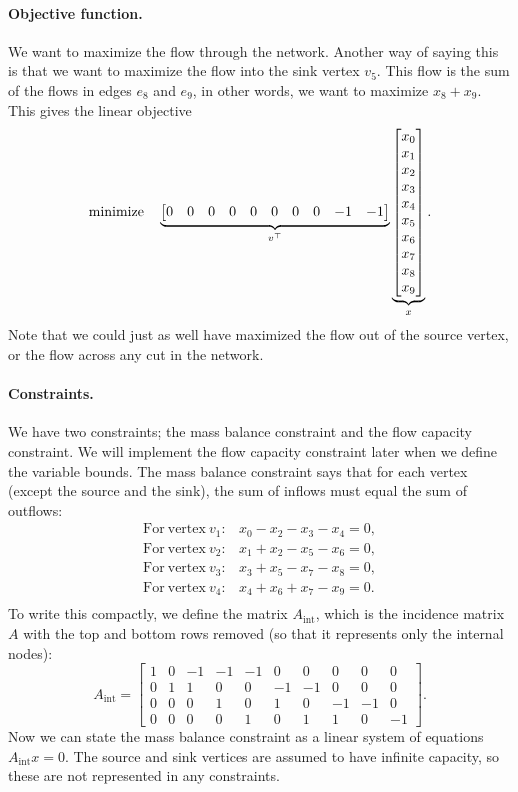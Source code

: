 \paragraph{Objective function.} We want to maximize the flow through the network. Another way of saying this is that we want to maximize the flow into the sink vertex $v_5$. This flow is the sum of the flows in edges $e_8$ and $e_9$, in other words, we want to maximize $x_8 + x_9$. This gives the linear objective
\[
\mathrm{minimize} \ \ \  \underbrace{\begin{bmatrix} 0 & 0 & 0 & 0 & 0 & 0 & 0 & 0 & -1 & -1 \end{bmatrix}}_{v^\top} \underbrace{\begin{bmatrix}x_0 \\ x_1 \\ x_2 \\ x_3 \\ x_4 \\ x_5 \\ x_6 \\ x_7 \\ x_8 \\ x_9 \end{bmatrix}}_x.
\]
Note that we could just as well have maximized the flow out of the source vertex, or the flow across any cut in the network.

\paragraph{Constraints.} We have two constraints; the mass balance constraint and the flow capacity constraint. We will implement the flow capacity constraint later when we define the variable bounds. The mass balance constraint says that for each vertex (except the source and the sink), the sum of inflows must equal the sum of outflows:
\[
\begin{array}{lr}
\mathrm{For\ vertex}\ v_1: & x_0 - x_2 - x_3 - x_4 = 0,\\
\mathrm{For\ vertex}\ v_2: & x_1 + x_2 - x_5 - x_6 = 0,\\
\mathrm{For\ vertex}\ v_3: & x_3 + x_5 - x_7 - x_8 = 0,\\
\mathrm{For\ vertex}\ v_4: & x_4 + x_6 + x_7 - x_9 = 0.\\
\end{array}
\]
To write this compactly, we define the matrix $A_{\mathrm{int}}$, which is the incidence matrix $A$ with the top and bottom rows removed (so that it represents only the internal nodes):
\[
A_{\mathrm{int}} = 
\begin{bmatrix}
 1 &  0 & -1 & -1 & -1 &  0 &  0 &  0 &  0 &  0 \\
 0 &  1 &  1 &  0 &  0 & -1 & -1 &  0 &  0 &  0 \\
 0 &  0 &  0 &  1 &  0 &  1 &  0 & -1 & -1 &  0 \\
 0 &  0 &  0 &  0 &  1 &  0 &  1 &  1 &  0 & -1 
 \end{bmatrix}.
\]
Now we can state the mass balance constraint as a linear system of equations $A_{\mathrm{int}}x = 0$. The source and sink vertices are assumed to have infinite capacity, so these are not represented in any constraints.

